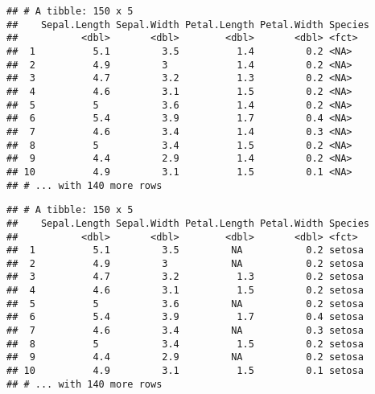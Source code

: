 \documentclass[]{book}
\newenvironment{Shaded}{\begin{snugshade}}{\end{snugshade}}
\newcommand{\DataTypeTok}[1]{\textcolor[rgb]{0.13,0.29,0.53}{#1}}
\newcommand{\FloatTok}[1]{\textcolor[rgb]{0.00,0.00,0.81}{#1}}
\newcommand{\KeywordTok}[1]{\textcolor[rgb]{0.13,0.29,0.53}{\textbf{#1}}}
\newcommand{\NormalTok}[1]{#1}
\newcommand{\OperatorTok}[1]{\textcolor[rgb]{0.81,0.36,0.00}{\textbf{#1}}}
\newcommand{\StringTok}[1]{\textcolor[rgb]{0.31,0.60,0.02}{#1}}
\begin{document}
\begin{Shaded}
\end{Shaded}

\begin{verbatim}
## # A tibble: 150 x 5
##    Sepal.Length Sepal.Width Petal.Length Petal.Width Species
##           <dbl>       <dbl>        <dbl>       <dbl> <fct>  
##  1          5.1         3.5          1.4         0.2 <NA>   
##  2          4.9         3            1.4         0.2 <NA>   
##  3          4.7         3.2          1.3         0.2 <NA>   
##  4          4.6         3.1          1.5         0.2 <NA>   
##  5          5           3.6          1.4         0.2 <NA>   
##  6          5.4         3.9          1.7         0.4 <NA>   
##  7          4.6         3.4          1.4         0.3 <NA>   
##  8          5           3.4          1.5         0.2 <NA>   
##  9          4.4         2.9          1.4         0.2 <NA>   
## 10          4.9         3.1          1.5         0.1 <NA>   
## # ... with 140 more rows
\end{verbatim}

\begin{Shaded}
\end{Shaded}

\begin{verbatim}
## # A tibble: 150 x 5
##    Sepal.Length Sepal.Width Petal.Length Petal.Width Species
##           <dbl>       <dbl>        <dbl>       <dbl> <fct>  
##  1          5.1         3.5         NA           0.2 setosa 
##  2          4.9         3           NA           0.2 setosa 
##  3          4.7         3.2          1.3         0.2 setosa 
##  4          4.6         3.1          1.5         0.2 setosa 
##  5          5           3.6         NA           0.2 setosa 
##  6          5.4         3.9          1.7         0.4 setosa 
##  7          4.6         3.4         NA           0.3 setosa 
##  8          5           3.4          1.5         0.2 setosa 
##  9          4.4         2.9         NA           0.2 setosa 
## 10          4.9         3.1          1.5         0.1 setosa 
## # ... with 140 more rows
\end{verbatim}
\end{document}
